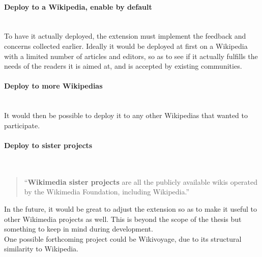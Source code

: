 \paragraph{Deploy to a Wikipedia, enable by default} ~\\
To have it actually deployed, the extension must implement the feedback and concerns collected earlier. Ideally it would be deployed at first on a Wikipedia with a limited number of articles and editors, so as to see if it actually fulfills the needs of the readers it is aimed at, and is accepted by existing communities.

\paragraph{Deploy to more Wikipedias} ~\\
It would then be possible to deploy it to any other Wikipedias that wanted to participate.

\paragraph{Deploy to sister projects} ~\\
\begin{quote}
``\textbf{Wikimedia sister projects} are all the publicly available wikis operated by the Wikimedia Foundation, including Wikipedia.'' \citep{wiki:29}
\end{quote}

In the future, it would be great to adjust the extension so as to make it useful to other Wikimedia projects as well. This is beyond the scope of the thesis but something to keep in mind during development. \\
One possible forthcoming project could be Wikivoyage, due to its structural similarity to Wikipedia.